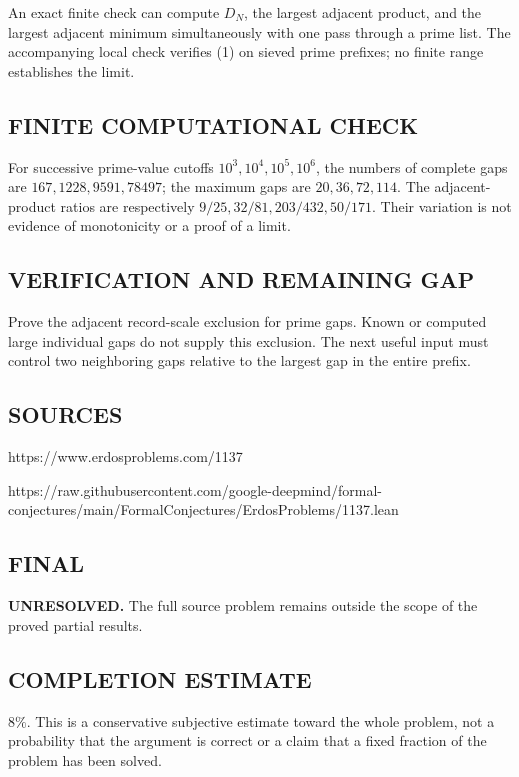 An exact finite check can compute $D_N$, the largest adjacent product, and the
largest adjacent minimum simultaneously with one pass through a prime list.
The accompanying local check verifies (1) on sieved prime prefixes; no finite
range establishes the limit.

\subsection*{FINITE COMPUTATIONAL CHECK}
For successive prime-value cutoffs $10^3,10^4,10^5,10^6$, the numbers of complete gaps are $167,1228,9591,78497$; the maximum gaps are $20,36,72,114$. The adjacent-product ratios are respectively $9/25,32/81,203/432,50/171$. Their variation is not evidence of monotonicity or a proof of a limit.

\subsection*{VERIFICATION AND REMAINING GAP}
Prove the adjacent record-scale exclusion for prime gaps. Known or computed
large individual gaps do not supply this exclusion. The next useful input must
control two neighboring gaps relative to the largest gap in the entire prefix.

\subsection*{SOURCES}
https://www.erdosproblems.com/1137

https://raw.githubusercontent.com/google-deepmind/formal-conjectures/main/FormalConjectures/ErdosProblems/1137.lean

\subsection*{FINAL}
\textbf{UNRESOLVED.} The full source problem remains outside the scope of the proved partial results.

\subsection*{COMPLETION ESTIMATE}
$8\%$. This is a conservative subjective estimate toward the whole problem, not a probability that the argument is correct or a claim that a fixed fraction of the problem has been solved.
